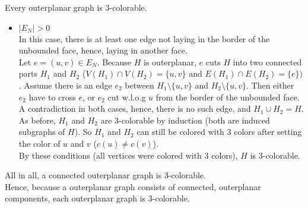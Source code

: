 \documentclass[a4paper]{article}
\begin{document}
\begin{solution}{24}
\begin{theorem}{Every outerplanar graph is 3-colorable.}
\begin{itemize}
\begin{itemize}
						\item {\emph{$|E_N| > 0$}}\\
							In this case, there is at least one edge not laying in the border of the unbounded face, hence, laying in another face.\\
							Let $e=(u,v) \in E_N$. Because $H$ is outerplanar, $e$ cuts $H$ into two connected parts $H_1$ and $H_2$ ($V(H_1) \cap V(H_2) = \{u,v\}$ and $E(H_1) \cap E(H_2) = \{e\})$. 
							Assume there is an edge $e_2$ between $H_1 \setminus \{u,v\}$ and $H_2 \setminus \{u,v\}$. Then either $e_2$ have to cross $e$, or $e_2$ cut w.l.o.g $u$ from the border of the unbounded face. A contradiction in both cases, hence, there is no such edge, and $H_1 \cup H_2 = H$.\\
							As before, $H_1$ and $H_2$  are 3-colorable by induction (both are induced subgraphs of $H$). So $H_1$ and $H_2$ can still be colored with 3 colors after setting the color of $u$ and $v$ ($c(u) \neq c(v)$).\\
							By these conditions (all vertices were colored with 3 colors), $H$ is 3-colorable.
				\end{itemize}
		\end{itemize}				

		All in all, a connected outerplanar graph is 3-colorable.\\
		Hence, because a outerplanar graph consists of connected, outerplanar components, each outerplanar graph is 3-colorable.

		\end{theorem}
	\end{solution}
		
\end{document}
